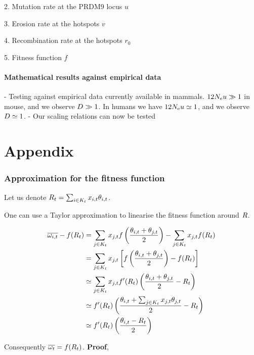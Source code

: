 \documentclass{article}
\begin{document}
2. Mutation rate at the PRDM9 locus $u$

3. Erosion rate at the hotspots $v$

4. Recombination rate at the hotspots $r_0$

5. Fitness function $f$

\subsection*{Mathematical results against empirical data}
- Testing against empirical data currently available in mammals. $12 N_\mathrm{e} u \gg 1$ in mouse, and we observe $D \gg 1$. In humans we have $12 N_\mathrm{e} u \simeq 1$, and we observe $D \simeq 1$.
- Our scaling relations can now be tested 




\part*{Appendix}
\section*{Approximation for the fitness function}
Let us denote $R_{t} =\sum_{i  \in K_{t}} x_{i,t} \theta _{i,t}$.

One can use a Taylor approximation to linearise the fitness function around $R $.  

\begin{align}
    \overline{\omega_{i,t}} - f(R_{t} ) &=
    \sum_{j \in K_{t}} x_{j,t} f \left( \dfrac{\theta _{i,t} + \theta _{j,t}}{2} \right) - \sum_{j \in K_{t}} x_{j,t} f(R_{t} ) \\
    &=
    \sum_{j \in K_{t}} x_{j,t}  \left[ f \left( \dfrac{\theta _{i,t} + \theta _{j,t}}{2} \right) - f(R_{t} ) \right] \\
    &\simeq
    \sum_{j \in K_{t}} x_{j,t}  f'(R_{t} ) \left( \dfrac{\theta _{i,t} + \theta _{j,t}}{2} - R_{t}  \right) \\
    &\simeq
     f'(R_{t} ) \left( \dfrac{\theta _{i,t} + \sum_{j \in K_{t}} x_{j,t} \theta _{j,t}}{2} - R_{t}  \right) \\
     &\simeq
     f'(R_{t} ) \left( \dfrac{\theta _{i,t} - R_{t} }{2}\right) \\
\end{align}

Consequently $\overline{\omega_{t}} = f(R_{t} )$. \textbf{Proof},
\end{document}
